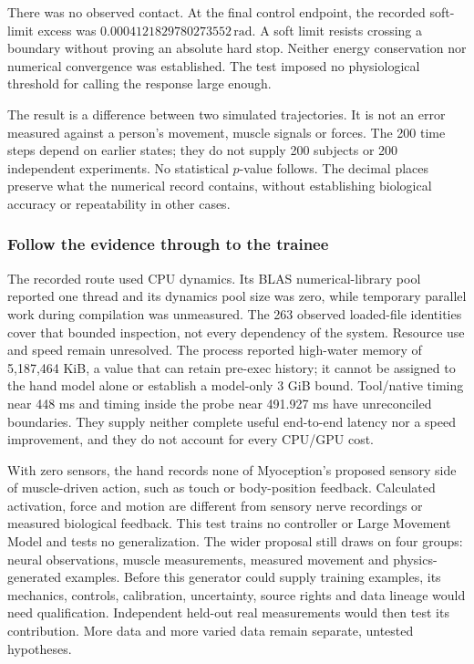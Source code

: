 There was no observed contact. At the final control endpoint, the recorded soft-limit excess was $0.0004121829780273552\,\mathrm{rad}$. A soft limit resists crossing a boundary without proving an absolute hard stop. Neither energy conservation nor numerical convergence was established. The test imposed no physiological threshold for calling the response large enough.

The result is a difference between two simulated trajectories. It is not an error measured against a person's movement, muscle signals or forces. The 200 time steps depend on earlier states; they do not supply 200 subjects or 200 independent experiments. No statistical $p$-value follows. The decimal places preserve what the numerical record contains, without establishing biological accuracy or repeatability in other cases.

\subsubsection{Follow the evidence through to the trainee}

The recorded route used CPU dynamics. Its BLAS numerical-library pool reported one thread and its dynamics pool size was zero, while temporary parallel work during compilation was unmeasured. The 263 observed loaded-file identities cover that bounded inspection, not every dependency of the system. Resource use and speed remain unresolved. The process reported high-water memory of 5,187,464 KiB, a value that can retain pre-exec history; it cannot be assigned to the hand model alone or establish a model-only 3 GiB bound. Tool/native timing near 448 ms and timing inside the probe near 491.927 ms have unreconciled boundaries. They supply neither complete useful end-to-end latency nor a speed improvement, and they do not account for every CPU/GPU cost.

With zero sensors, the hand records none of Myoception's proposed sensory side of muscle-driven action, such as touch or body-position feedback. Calculated activation, force and motion are different from sensory nerve recordings or measured biological feedback. This test trains no controller or Large Movement Model and tests no generalization. The wider proposal still draws on four groups: neural observations, muscle measurements, measured movement and physics-generated examples. Before this generator could supply training examples, its mechanics, controls, calibration, uncertainty, source rights and data lineage would need qualification. Independent held-out real measurements would then test its contribution. More data and more varied data remain separate, untested hypotheses.

